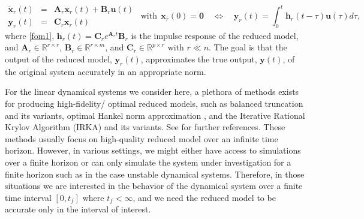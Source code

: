 \documentclass[preprint]{elsarticle}
\theoremstyle{definition}
\theoremstyle{definition}
\numberwithin{equation}{section}
\newcommand{\R}{\mathbb{R}}
\newcommand{\x}{\mathbf{x}}
\newcommand{\A}{\mathbf{A}}
\newcommand{\B}{\mathbf{B}}
\newcommand{\C}{\mathbf{C}}
\newcommand{\y}{\mathbf{y}}
\newcommand{\uu}{\mathbf{u}}
\newcommand{\h}{\mathbf{h}}
\begin{document}
\begin{equation}  \label{rom1}
\begin{array}{rcl}
\dot{\x}_r(t) & =& \A_r\x_r(t) +\B_r\uu(t)\\
\y_r(t)&=&\C_r\x_r(t) 
\end{array}
~~\mbox{with}~~ \x_r(0) = \mathbf{0}
\quad \Longleftrightarrow \quad
\y_r(t)=\int_{0}^{t}\h_r (t-\tau)\uu(\tau) d\tau,
\end{equation}
%
%
where \eqref{fom1}, $\h_r(t)=\C_r e^{\A_r t}\B_r$ is the impulse response of the reduced model, and $\A_r \in \R^{r\times r}$, $\B_r\in \R^{r\times m}$, and $\C_r\in \R^{p\times r}$ with $r\ll n$. The goal is that the output of the reduced model, $\y_r(t)$, approximates the true output, $\y(t)$, of the original system accurately in an appropriate norm. 

For the linear dynamical systems we consider here, a plethora of methods exists
for producing high-fidelity/ optimal reduced models, such as  balanced truncation \cite{MulR76, Moo81} and its variants, optimal Hankel norm approximation \cite{Glo84}, and the Iterative Rational Krylov Algorithm (IRKA) \cite{GugBA08} and its variants.  See \cite{Ant05,BauBF14,BenGW05} for further references.
These methods usually focus on high-quality reduced model  over an infinite time horizon. However, in various settings, we might either have access to simulations over a finite horizon or can only simulate the system under investigation for a finite horizon such as in the case unstable dynamical systems. Therefore, in those situations we are interested in the behavior of the dynamical system over a finite time interval $[0,t_f]$ where $t_f < \infty$, and we need the reduced model to be accurate only in the interval of interest. 
\end{document}
